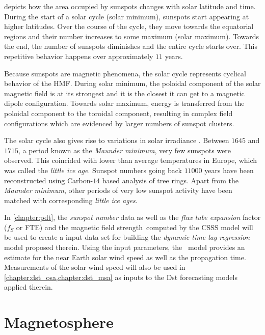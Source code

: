  depicts how the area occupied by sunspots changes with solar latitude 
and time. During the start of a solar cycle (solar minimum), sunspots start appearing at higher 
latitudes. Over the course of the cycle, they move towards the equatorial regions and their number 
increases to some maximum (solar maximum). Towards the end, the number of sunspots diminishes and 
the entire cycle starts over. This repetitive behavior happens over approximately $11$ years.

Because sunspots are magnetic phenomena, the solar cycle represents cyclical behavior of the HMF. 
During solar minimum, the poloidal component of the solar magnetic field is at its strongest and it 
is the closest it can get to a magnetic dipole configuration. Towards solar maximum, energy is 
transferred from the poloidal component to the toroidal component, resulting in complex field 
configurations which are evidenced by larger numbers of sunspot clusters.

The solar cycle also gives rise to variations in solar irradiance \citep{solarirradiance}. Between 
$1645$ and $1715$, a period known as the \emph{Maunder minimum}, very few sunspots were observed. 
This coincided with lower than average temperatures in Europe, which was called the 
\emph{little ice age}. Sunspot numbers going back $11000$ years have been reconstructed using 
Carbon-$14$ based analysis of tree rings. Apart from the \emph{Maunder minimum}, other periods of 
very low sunspot activity have been matched with corresponding \emph{little ice ages}.

In \cref{chapter:pdt}, the \emph{sunspot number} data as well as the \emph{flux tube expansion} 
factor ($f_S$ or FTE) and the magnetic field strength computed by the CSSS model will be used to 
create a input data set for building the \emph{dynamic time lag regression} model proposed therein. 
Using the input parameters, the \XX \ model provides an estimate for the near Earth solar wind speed 
as well as the propagation time. Measurements of the solar wind speed will also be used in 
\cref{chapter:dst_osa,chapter:dst_msa} as inputs to the Dst forecasting models applied therein.


\section{Magnetosphere}\label{sec:mag}


